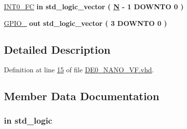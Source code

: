 \begin{DoxyCompactItemize}
\item 
\hyperlink{class_d_e0___n_a_n_o___v_f_a2da3143aa39453a927d622998a1d936b}{I\+N\+T0\+\_\+\+F\+C}  {\bfseries {\bfseries \textcolor{keywordflow}{in}\textcolor{vhdlchar}{ }}} {\bfseries \textcolor{comment}{std\+\_\+logic\+\_\+vector}\textcolor{vhdlchar}{ }\textcolor{vhdlchar}{(}\textcolor{vhdlchar}{ }\textcolor{vhdlchar}{ }\textcolor{vhdlchar}{ }\textcolor{vhdlchar}{ }{\bfseries \hyperlink{class_d_e0___n_a_n_o___v_f_af855138be951f4c562436dfd59f85b54}{N}} \textcolor{vhdlchar}{-\/}\textcolor{vhdlchar}{ } \textcolor{vhdldigit}{1} \textcolor{vhdlchar}{ }\textcolor{keywordflow}{D\+O\+W\+N\+T\+O}\textcolor{vhdlchar}{ }\textcolor{vhdlchar}{ } \textcolor{vhdldigit}{0} \textcolor{vhdlchar}{ }\textcolor{vhdlchar}{)}\textcolor{vhdlchar}{ }} 
\item 
\hyperlink{class_d_e0___n_a_n_o___v_f_a01eff012417d9c479e11ca1e08d0fdb5}{G\+P\+I\+O\+\_}  {\bfseries {\bfseries \textcolor{keywordflow}{out}\textcolor{vhdlchar}{ }}} {\bfseries \textcolor{comment}{std\+\_\+logic\+\_\+vector}\textcolor{vhdlchar}{ }\textcolor{vhdlchar}{(}\textcolor{vhdlchar}{ }\textcolor{vhdlchar}{ } \textcolor{vhdldigit}{3} \textcolor{vhdlchar}{ }\textcolor{keywordflow}{D\+O\+W\+N\+T\+O}\textcolor{vhdlchar}{ }\textcolor{vhdlchar}{ } \textcolor{vhdldigit}{0} \textcolor{vhdlchar}{ }\textcolor{vhdlchar}{)}\textcolor{vhdlchar}{ }} 
\end{DoxyCompactItemize}


\subsection{Detailed Description}


Definition at line \hyperlink{_d_e0___n_a_n_o___v_f_8vhd_source_l00015}{15} of file \hyperlink{_d_e0___n_a_n_o___v_f_8vhd_source}{D\+E0\+\_\+\+N\+A\+N\+O\+\_\+\+V\+F.\+vhd}.



\subsection{Member Data Documentation}
\hypertarget{class_d_e0___n_a_n_o___v_f_a4b5e1e3eba67b2e61c77c9a719d8518c}{}
\subsubsection[{C\+L\+O\+C\+K\+\_\+50}]{ {\bfseries \textcolor{keywordflow}{in}\textcolor{vhdlchar}{ }} {\bfseries \textcolor{comment}{std\+\_\+logic}\textcolor{vhdlchar}{ }} \hspace{0.3cm}{\ttfamily [Port]}}\label{class_d_e0___n_a_n_o___v_f_a4b5e1e3eba67b2e61c77c9a719d8518c}


